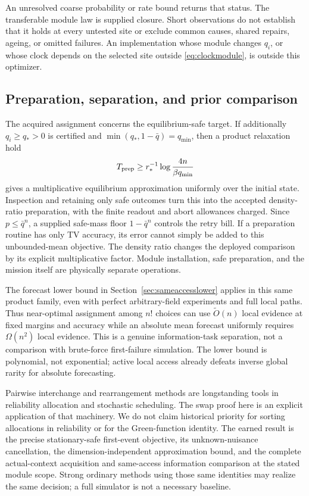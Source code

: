 An unresolved coarse probability or rate bound returns that status.
The transferable module law is supplied closure.  Short observations do
not establish that it holds at every untested site or exclude common
causes, shared repairs, ageing, or omitted failures.  An implementation
whose module changes $q_i$, or whose clock depends on the selected site
outside \eqref{eq:clockmodule}, is outside this optimizer.

\subsection{Preparation, separation, and prior comparison}
The acquired assignment concerns the equilibrium-safe target.
If additionally $q_i\ge q_*>0$ is certified and
$\min(q_*,1-\bar q)=q_{\min}$, then a product relaxation hold
\[
 T_{\rm prep}\ge r_*^{-1}\log\frac{4n}{\beta q_{\min}}
\]
gives a multiplicative equilibrium approximation uniformly over the
initial state.  Inspection and retaining only safe outcomes turn this
into the accepted density-ratio preparation, with the finite readout and
abort allowances charged.  Since $p\le\bar q^n$, a supplied safe-mass
floor $1-\bar q^n$ controls the retry bill.  If a preparation routine has
only TV accuracy, its error cannot simply be added to this unbounded-mean
objective.  The density ratio changes the deployed comparison by its
explicit multiplicative factor.  Module installation, safe preparation,
and the mission itself are physically separate operations.

The forecast lower bound in Section~\ref{sec:sameaccesslower} applies in
this same product family, even with perfect arbitrary-field experiments
and full local paths.  Thus near-optimal assignment among $n!$ choices can
use $\widetilde O(n)$ local evidence at fixed margins and accuracy while
an absolute mean forecast uniformly requires $\Omega(n^2)$ local
evidence.  This is a genuine information-task separation, not a comparison
with brute-force first-failure simulation.  The lower bound is polynomial,
not exponential; active local access already defeats inverse global
rarity for absolute forecasting.

Pairwise interchange and rearrangement methods are longstanding tools in
reliability allocation and stochastic scheduling.  The swap proof here
is an explicit application of that machinery.  We do not claim historical
priority for sorting allocations in reliability or for the Green-function
identity.  The earned result is the precise stationary-safe first-event
objective, its unknown-nuisance cancellation, the dimension-independent
approximation bound, and the complete actual-context acquisition and
same-access information comparison at the stated module scope.  Strong
ordinary methods using those same identities may realize the same
decision; a full simulator is not a necessary baseline.
